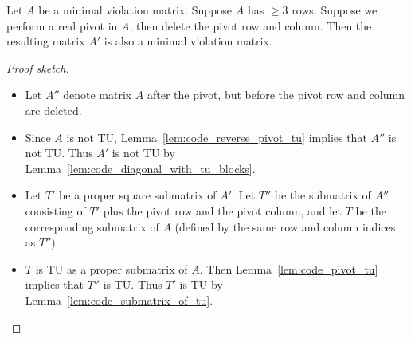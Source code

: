 \begin{lemma}
  \label{lem:code_mvm_pivot}
  Let $A$ be a minimal violation matrix. Suppose $A$ has $\geq 3$ rows.
  Suppose we perform a real pivot in $A$, then delete the pivot row and column.
  Then the resulting matrix $A'$ is also a minimal violation matrix.
\end{lemma}

\begin{proof}[Proof sketch]
  \begin{itemize}
    \item Let $A''$ denote matrix $A$ after the pivot, but before the pivot row and column are deleted.
    \item Since $A$ is not TU, Lemma~\ref{lem:code_reverse_pivot_tu} implies that $A''$ is not TU. Thus $A'$ is not TU by Lemma~\ref{lem:code_diagonal_with_tu_blocks}.
    \item Let $T'$ be a proper square submatrix of $A'$. Let $T''$ be the submatrix of $A''$ consisting of $T'$ plus the pivot row and the pivot column, and let $T$ be the corresponding submatrix of $A$ (defined by the same row and column indices as $T''$).
    \item $T$ is TU as a proper submatrix of $A$. Then Lemma~\ref{lem:code_pivot_tu} implies that $T''$ is TU. Thus $T'$ is TU by Lemma~\ref{lem:code_submatrix_of_tu}.
  \end{itemize}
\end{proof}
